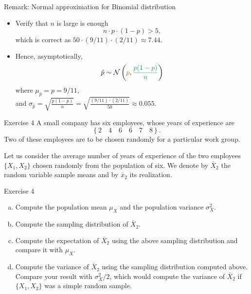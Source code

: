 \documentclass[
  11pt,
  ignorenonframetext,
]{beamer}
\providecommand{\tightlist}{%
  \setlength{\itemsep}{0pt}\setlength{\parskip}{0pt}}
\begin{document}
\begin{frame}{Remark: Normal approximation for Binomial distribution}
\protect\hypertarget{remark-normal-approximation-for-binomial-distribution}{}
\begin{itemize}
\tightlist
\item
  Verify that \(n\) is large is enough \[
  n \cdot p \cdot (1-p) > 5,
  \] which is correct as \(50 \cdot (9/11) \cdot (2/11) \approx 7.44\).
\end{itemize}

\vspace{3mm}

\begin{itemize}
\tightlist
\item
  Hence, asymptotically, \[
  \hat{p} \sim \mathcal{N} \left({\color{red}{p}}, {\color{green}{\frac{p(1-p)}{n}}} \right)
  \] where \(\mu_{\hat{p}} = p = 9/11\),\\
  and
  \(\sigma_{\hat{p}} = \sqrt{\frac{p(1-p)}{n}} = \sqrt{\frac{(9/11)\cdot (2/11)}{50}} \approx 0.055\).
\end{itemize}
\end{frame}

\begin{frame}{Exercise 4}
\protect\hypertarget{exercise-4}{}
A small company has six employees, whose years of experience are \[
\left\{2\quad  4\quad  6\quad 6\quad 7\quad  8\right\}.
\] Two of these employees are to be chosen randomly for a particular
work group.

Let us consider the average number of years of experience of the two
employees \(\{X_1,X_2\}\) chosen randomly from the population of six. We
denote by \(\bar{X}_2\) the random variable sample means and by
\(\bar{x}_2\) its realization.
\end{frame}

\begin{frame}{Exercise 4}
\protect\hypertarget{exercise-4-1}{}
\begin{enumerate}
[(a)]
\item
  Compute the population mean \(\mu_X\) and the population variance
  \(\sigma_X^2\).
\item
  Compute the sampling distribution of \(\bar{X}_2\).
\item
  Compute the expectation of \(\bar{X}_2\) using the above sampling
  distribution and compare it with \(\mu_X\).
\item
  Compute the variance of \(\bar{X}_2\) using the sampling distribution
  computed above. Compare your result with \(\sigma^2_X/2\), which would
  compute the variance of \(\bar{X}_2\) if \(\{X_1,X_2\}\) was a simple
  random sample.
\end{enumerate}
\end{frame}
\end{document}
